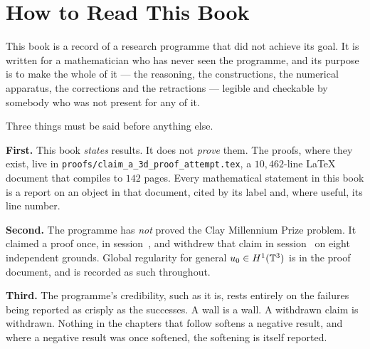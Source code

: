 
\chapter{How to Read This Book}
\label{ch:how-to-read}

This book is a record of a research programme that did not achieve its goal.
It is written for a mathematician who has never seen the programme, and its
purpose is to make the whole of it --- the reasoning, the constructions, the
numerical apparatus, the corrections and the retractions --- legible and
checkable by somebody who was not present for any of it.

Three things must be said before anything else.

\begin{record}
\textbf{First.} This book \emph{states} results. It does not \emph{prove}
them. The proofs, where they exist, live in
\texttt{proofs/claim\_a\_3d\_proof\_attempt.tex}, a \(10{,}462\)-line
\LaTeX{} document that compiles to \(142\) pages. Every mathematical
statement in this book is a report on an object in that document, cited by
its label and, where useful, its line number.

\smallskip
\textbf{Second.} The programme has \emph{not} proved the Clay Millennium
Prize problem. It claimed a proof once, in session~, and withdrew that
claim in session~ on eight independent grounds. Global regularity for
general \(u_0\in H^1(\mathbb{T}^3)\) is \OPEN{} in the proof document, and is
recorded as such throughout.

\smallskip
\textbf{Third.} The programme's credibility, such as it is, rests entirely on
the failures being reported as crisply as the successes. A wall is a wall. A
withdrawn claim is withdrawn. Nothing in the chapters that follow softens a
negative result, and where a negative result was once softened, the softening
is itself reported.
\end{record}

